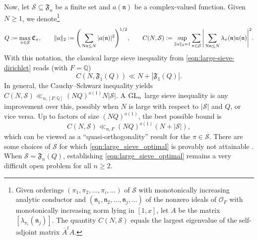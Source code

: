 \documentclass[11pt]{amsart}
\theoremstyle{remark}
\numberwithin{equation}{section}
\newcommand{\kn}{\mathfrak{n}}
\newcommand{\N}{\textnormal{N}}
\newcommand{\Q}{\mathbb{Q}}
\newcommand{\mS}{\mathcal{S}}
\newcommand{\GL}{\textnormal{GL}}
\begin{document}
Now, let $\mathcal{S}\subseteq\mathfrak{F}_n$ be a finite set and $a(\kn)$ be a complex-valued function.  Given $N\geq 1$, we denote\footnote{Given orderings $(\pi_1,\pi_2,\ldots,\pi_i,\ldots)$ of $\mathcal{S}$ with monotonically increasing analytic conductor and $(\kn_1,\kn_2,\ldots,\kn_j,\ldots)$ of the nonzero ideals of $\mathcal{O}_F$ with monotonically increasing norm lying in $[1,x]$, let $A$ be the matrix $[\lambda_{\pi_i}(\kn_j)]$.  The quantity $C(N,\mathcal{S})$ equals the largest eigenvalue of the self-adjoint matrix $\overline{A}^t A$.}
\[
Q := \max_{\pi\in\mathcal{S}}\mathfrak{C}_{\pi}, 
\qquad 
\|a\|_2 := \Bigg(\sum_{\N\kn\leq N}|a(\kn)|^2\Bigg)^{1/2},\qquad C(N,\mathcal{S}):=\sup_{\|a\|_2=1}\sum_{\pi\in\mathcal{S}}\Bigg|\sum_{\N\kn\leq N}\lambda_{\pi}(\kn)a(\kn)\Bigg|^2.
\]
With this notation, the classical large sieve inequality from \eqref{eqn:large-sieve-dirichlet} reads (with $F = \Q$)
\begin{equation}
\label{eqn:GL1_large_sieve}
C(N,\mathfrak{F}_1(Q))\ll N+|\mathfrak{F}_1(Q)|.
\end{equation}
In general, the Cauchy--Schwarz inequality yields $C(N,\mathcal{S})\ll_{n,[F:\Q]} (NQ)^{o(1)}N|\mathcal{S}|$. A $\GL_n$ large sieve inequality is any improvement over this, possibly when $N$ is large with respect to $|\mathcal{S}|$ and $Q$, or vice versa. Up to factors of size $(NQ)^{o(1)}$, the best possible bound is
\begin{equation}
\label{eqn:large_sieve_optimal}
C(N,\mathcal{S})\ll_{n,F}(NQ)^{o(1)}(N+|\mathcal{S}|),
\end{equation}
which can be viewed as a ``quasi-orthogonality'' result for the $\pi\in\mathcal{S}$. There are some choices of $\mathcal{S}$ for which \eqref{eqn:large_sieve_optimal} is provably not attainable \cite{DunnRadziwill,IwaniecLi}. When $\mS = \mathfrak{F}_n(Q)$, establishing \eqref{eqn:large_sieve_optimal} remains a very difficult open problem for all $n \ge 2$.
\end{document}
